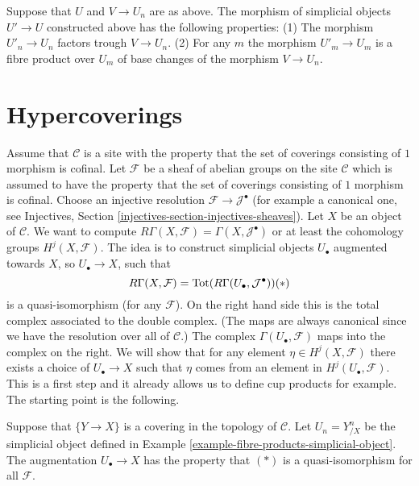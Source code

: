 \begin{lemma}
\label{lemma-construct-new-covers}
Suppose that $U$ and $V\to U_n$ are as above.
The morphism of simplicial objects 
$U' \to U$ constructed above has the following 
properties:
(1) The morphism $U'_n \to U_n$ factors trough $V \to U_n$.
(2) For any $m$ the morphism $U'_m \to U_m$
is a fibre product over $U_m$ of base changes
of the morphism $V \to U_n$.
\end{lemma}





\section{Hypercoverings}

\noindent
Assume that $\mathcal{C}$ is a site with the property
that the set of coverings consisting of $1$ morphism is cofinal.
Let $\mathcal{F}$ be a sheaf of abelian groups on
the site $\mathcal{C}$ which is assumed to have the property
that the set of coverings consisting of $1$ morphism is cofinal.
Choose an injective resolution $\mathcal{F} \to \mathcal{J}^\bullet$
(for example a canonical one, see 
Injectives, Section \ref{injectives-section-injectives-sheaves}).
Let $X$ be an object of $\mathcal{C}$. We want to compute 
$R\Gamma(X, \mathcal{F}) = \Gamma(X, \mathcal{J}^\bullet)$
or at least the cohomology groups $H^j(X, \mathcal{F})$.
The idea is to construct simplicial objects $U_\bullet$ 
augmented towards $X$, so $U_\bullet \to X$, such that 
$$
R\Gamma(X, \mathcal{F}) 
= \text{Tot}(R\Gamma(U_\bullet, \mathcal{J}^\bullet))
\relax{(*)}
$$
is a quasi-isomorphism (for any $\mathcal{F}$). On the right hand 
side this is the total complex associated to the double complex. 
(The maps are always canonical since we have the resolution over 
all of $\mathcal{C}$.)
The complex $\Gamma(U_\bullet, \mathcal{F})$ maps into the
complex on the right. We will show that for any
element $\eta \in H^j(X, \mathcal{F})$ there exists a choice
of $U_\bullet \to X$ such that $\eta$ comes from an element
in $H^j(U_\bullet, \mathcal{F})$. This is a first step and
it already allows us to define cup products for example.
The starting point is the following.

\begin{lemma}
\label{lemma-product-hypercovering}
Suppose that $\{Y \to X\}$ is a covering in the topology of
$\mathcal{C}$. Let $U_n = Y^n_{/X}$ be the simplicial
object defined in Example \ref{example-fibre-products-simplicial-object}.
The augmentation $U_\bullet \to X$ has the property
that $(*)$ is a quasi-isomorphism for all $\mathcal{F}$.
\end{lemma}

